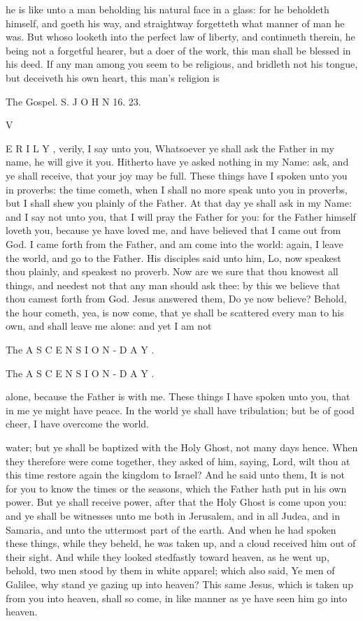 he is like unto a man beholding his natural face in a glass: for he beholdeth himself, and goeth his way, and straightway forgetteth what manner of man he was. But whoso looketh into the perfect law of liberty, and continueth therein, he being not a forgetful hearer, but a doer of the work, this man shall be blessed in his deed. If any man among you seem to be religious, and bridleth not his tongue, but deceiveth his own heart, this man’s religion is

The Gospel. S. J O H N 16. 23.

V

E R I L Y , verily, I say unto you, Whatsoever ye shall ask the Father in my name, he will give it you. Hitherto have ye asked nothing in my Name: ask, and ye shall receive, that your joy may be full. These things have I spoken unto you in proverbs: the time cometh, when I shall no more speak unto you in proverbs, but I shall shew you plainly of the Father. At that day ye shall ask in my Name: and I say not unto you, that I will pray the Father for you: for the Father himself loveth you, because ye have loved me, and have believed that I came out from God. I came forth from the Father, and am come into the world: again, I leave the world, and go to the Father. His disciples said unto him, Lo, now speakest thou plainly, and speakest no proverb. Now are we sure that thou knowest all things, and needest not that any man should ask thee: by this we believe that thou camest forth from God. Jesus answered them, Do ye now believe? Behold, the hour cometh, yea, is now come, that ye shall be scattered every man to his own, and shall leave me alone: and yet I am not

The A S C E N S I O N - D A Y .

The A S C E N S I O N - D A Y .

alone, because the Father is with me. These things I have spoken unto you, that in me ye might have peace. In the world ye shall have tribulation; but be of good cheer, I have overcome the world.

water; but ye shall be baptized with the Holy Ghost, not many days hence. When they therefore were come together, they asked of him, saying, Lord, wilt thou at this time restore again the kingdom to Israel? And he said unto them, It is not for you to know the times or the seasons, which the Father hath put in his own power. But ye shall receive power, after that the Holy Ghost is come upon you: and ye shall be witnesses unto me both in Jerusalem, and in all Judea, and in Samaria, and unto the uttermost part of the earth. And when he had spoken these things, while they beheld, he was taken up, and a cloud received him out of their sight. And while they looked stedfastly toward heaven, as he went up, behold, two men stood by them in white apparel; which also said, Ye men of Galilee, why stand ye gazing up into heaven? This same Jesus, which is taken up from you into heaven, shall so come, in like manner as ye have seen him go into heaven.

